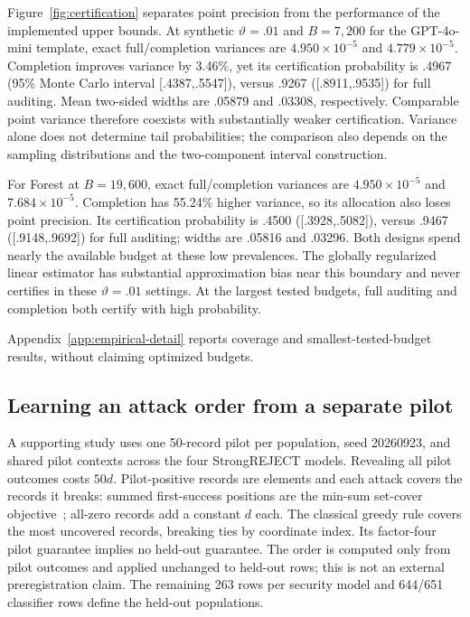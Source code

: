 \documentclass[conference]{IEEEtran}
\begin{document}
Figure~\ref{fig:certification} separates point precision from the performance of the implemented upper bounds. At synthetic $\vartheta=.01$ and $B=7{,}200$ for the GPT-4o-mini template, exact full/completion variances are $4.950\times10^{-5}$ and $4.779\times10^{-5}$. Completion improves variance by 3.46\%, yet its certification probability is .4967 (95\% Monte Carlo interval [.4387,.5547]), versus .9267 ([.8911,.9535]) for full auditing. Mean two-sided widths are .05879 and .03308, respectively. Comparable point variance therefore coexists with substantially weaker certification. Variance alone does not determine tail probabilities; the comparison also depends on the sampling distributions and the two-component interval construction.

For Forest at $B=19{,}600$, exact full/completion variances are $4.950\times10^{-5}$ and $7.684\times10^{-5}$. Completion has 55.24\% higher variance, so its allocation also loses point precision. Its certification probability is .4500 ([.3928,.5082]), versus .9467 ([.9148,.9692]) for full auditing; widths are .05816 and .03296. Both designs spend nearly the available budget at these low prevalences. The globally regularized linear estimator has substantial approximation bias near this boundary and never certifies in these $\vartheta=.01$ settings. At the largest tested budgets, full auditing and completion both certify with high probability.

Appendix~\ref{app:empirical-detail} reports coverage and smallest-tested-budget results, without claiming optimized budgets.

\subsection{Learning an attack order from a separate pilot}\label{sec:ordering}
A supporting study uses one 50-record pilot per population, seed 20260923, and shared pilot contexts across the four StrongREJECT models. Revealing all pilot outcomes costs $50d$. Pilot-positive records are elements and each attack covers the records it breaks: summed first-success positions are the min-sum set-cover objective~\cite{minsumcover}; all-zero records add a constant $d$ each. The classical greedy rule covers the most uncovered records, breaking ties by coordinate index. Its factor-four pilot guarantee implies no held-out guarantee. The order is computed only from pilot outcomes and applied unchanged to held-out rows; this is not an external preregistration claim. The remaining 263 rows per security model and 644/651 classifier rows define the held-out populations.
\end{document}
